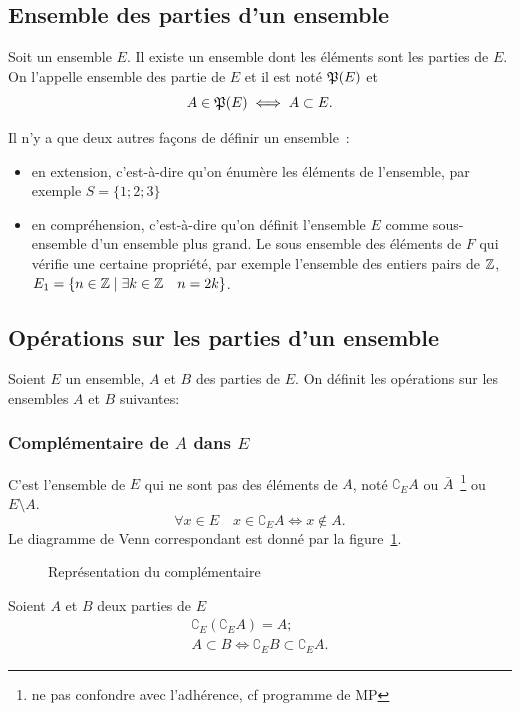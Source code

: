 \subsection{Ensemble des parties d'un ensemble}
\label{chap3-subsec:ensembledesparties}
\begin{prop}[Admise]
  Soit un ensemble $E$. Il existe un ensemble dont les éléments sont les parties de $E$. On l'appelle ensemble des partie de $E$ et il est noté $\mathfrak{P}(E)$ et
\begin{equation}
  A \in \mathfrak{P}(E) \iff A \subset E.
\end{equation}
\end{prop}
Il n'y a que deux autres façons de définir un ensemble~:
\begin{itemize}
\item en extension, c'est-à-dire qu'on énumère les éléments de l'ensemble, par exemple $S=\{1;2;3\}$
\item en compréhension, c'est-à-dire qu'on définit l'ensemble $E$ comme sous-ensemble d'un ensemble plus grand. Le sous ensemble des éléments de $F$ qui vérifie une certaine propriété, par exemple l'ensemble des entiers pairs de $\mathbb{Z}$, $E_1=\left\{n\in\mathbb{Z}\mathrel{}\middle|\mathrel{}\exists k \in \mathbb{Z} \quad n=2k\right\}$.
\end{itemize}
%
\subsection{Opérations sur les parties d'un ensemble}
\label{chap3-subsec:operationparties}
Soient $E$ un ensemble, $A$ et $B$ des parties de $E$. On définit les opérations sur les ensembles $A$ et $B$ suivantes:
%
\subsubsection{Complémentaire de $A$ dans $E$} 
\label{chap3-subsubsec:complementaire}
C'est l'ensemble de $E$ qui ne sont pas des éléments de $A$, noté $\complement_E A$ ou $\bar{A}$~\footnote{ne pas confondre avec l'adhérence, cf programme de MP} ou $E \setminus A$.
\begin{equation} 
  \forall x \in E \quad x \in \complement_E A \iff x \not\in A.
\end{equation}
Le diagramme de Venn correspondant est donné par la figure~\ref{chap3-fig:comp}.
\begin{figure}
\centering
{}
\caption{Représentation du complémentaire}
\label{chap3-fig:comp}
\end{figure}
\begin{prop}
  Soient $A$ et $B$ deux parties de $E$
  \begin{gather}
  \complement_E (\complement_E A)=A;\\
  A \subset B \iff \complement_E B \subset \complement_E A.
  \end{gather}
\end{prop}
%
